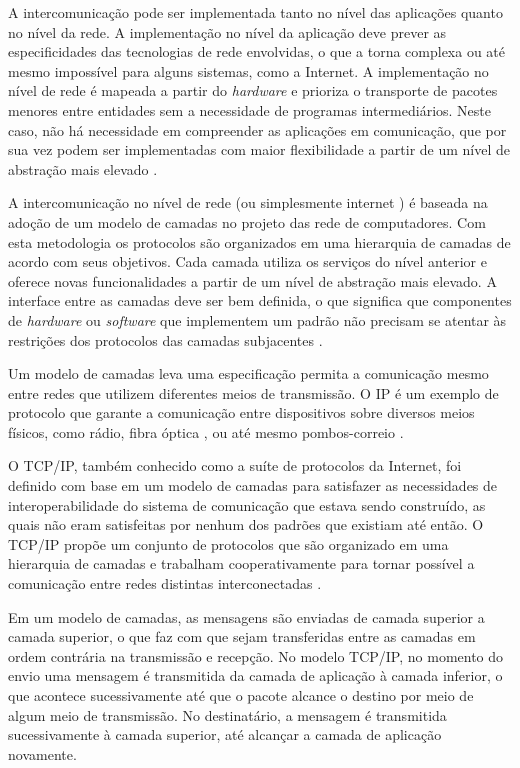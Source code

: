 A intercomunicação pode ser implementada tanto no nível das aplicações quanto no
nível da rede. A implementação no nível da aplicação deve prever as especificidades
das tecnologias de rede envolvidas, o que a torna complexa ou até mesmo impossível
para alguns sistemas, como a Internet. A implementação no nível de rede é mapeada
a partir do \textit{hardware} e prioriza o transporte de pacotes menores entre
entidades sem a necessidade de programas intermediários. Neste caso, não há
necessidade em compreender as aplicações em comunicação, que por sua vez podem ser
implementadas com maior flexibilidade a partir de um nível de abstração mais elevado
\cite{comer2000}.

A intercomunicação no nível de rede (ou simplesmente internet \cite{comer2000}) é
baseada na adoção de um modelo de camadas no projeto das rede de computadores. Com
esta metodologia os protocolos são organizados em uma hierarquia de camadas de
acordo com seus objetivos. Cada camada utiliza os serviços do nível anterior e
oferece novas funcionalidades a partir de um nível de abstração mais elevado. A
interface entre as camadas deve ser bem definida, o que significa que componentes de
\textit{hardware} ou \textit{software} que implementem um padrão não precisam se
atentar às restrições dos protocolos das camadas subjacentes \cite{kurose2012}.

Um modelo de camadas leva uma especificação permita a comunicação mesmo entre redes
que utilizem diferentes meios de transmissão. O IP é um exemplo de protocolo que
garante a comunicação entre dispositivos sobre diversos meios físicos, como rádio,
fibra óptica \cite{tanenbaum2010}, ou até mesmo pombos-correio \cite{rfc1149}.

O TCP/IP, também conhecido como a suíte de protocolos da Internet, foi definido com
base em um modelo de camadas para satisfazer as necessidades de interoperabilidade
do sistema de comunicação que estava sendo construído, as quais não eram satisfeitas
por nenhum dos padrões que existiam até então. O TCP/IP propõe um conjunto de
protocolos  que são organizado em uma hierarquia de camadas e trabalham
cooperativamente para tornar possível a comunicação entre redes distintas
interconectadas \cite{comer2000}.

Em um modelo de camadas, as mensagens são enviadas de camada superior a camada
superior, o que faz com que sejam transferidas entre as camadas em ordem contrária
na transmissão e recepção. No modelo TCP/IP, no momento do envio uma mensagem é
transmitida da camada de aplicação à camada inferior, o que acontece sucessivamente
até que o pacote alcance o destino por meio de algum meio de transmissão. No
destinatário, a mensagem é transmitida sucessivamente à camada superior, até
alcançar a camada de aplicação novamente.

